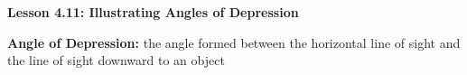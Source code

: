 \begin{center}
\textbf{Lesson 4.11: Illustrating Angles of Depression}
\end{center}

\vspace*{-1.5ex}

\noindent \textbf{Angle of Depression:} the angle formed between the horizontal line of sight and the line of sight downward to an object



